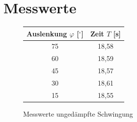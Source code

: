 \documentclass[fontsize=12pt]{scrartcl}
\begin{document}
\newpage

\section{ Messwerte}
\begin{figure}[H]
\centering
\caption{Messwerte ungedämpfte Schwingung}
\begin{tabular}{|c|c|} \hline
Auslenkung $\varphi$ 	[$^{\circ}$] & Zeit $T$ [s]\\ \hline
75	&18,58 \\ \hline
60	&18,59\\ \hline
45	&18,57\\ \hline
30	&18,61\\ \hline
15	&18,55\\ \hline
\end{tabular}					
\end{figure}
\end{document}
